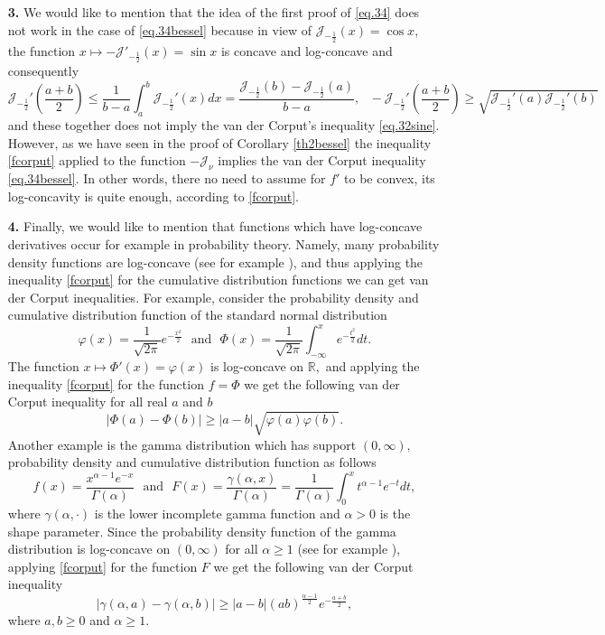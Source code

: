 \documentclass[10pt]{amsart}
\begin{document}
\begin{enumerate}
\item[\bf 3.] We would like to mention that the idea of the first proof of \eqref{eq.34} does not work in the case of \eqref{eq.34bessel} because in view of
$\mathcal{J}_{-\frac{1}{2}}(x)=\cos x,$ the function
$x\mapsto -\mathcal{J}'_{-\frac{1}{2}}(x)=\sin x$ is concave and log-concave and consequently
$$\mathcal{J}_{-\frac{1}{2}}'\left(\frac{a+b}{2}\right)\leq \frac{1}{b-a}\int_a^b\mathcal{J}_{-\frac{1}{2}}'(x)dx=\frac{\mathcal{J}_{-\frac{1}{2}}(b)-\mathcal{J}_{-\frac{1}{2}}(a)}{b-a},\ \ \ -\mathcal{J}_{-\frac{1}{2}}'\left(\frac{a+b}{2}\right)\geq \sqrt{\mathcal{J}_{-\frac{1}{2}}'(a)\mathcal{J}_{-\frac{1}{2}}'(b)}$$
and these together does not imply the van der Corput's inequality \eqref{eq.32sine}. However, as we have seen in the proof of Corollary \ref{th2bessel} the inequality \eqref{fcorput} applied to the function $-\mathcal{J}_{\nu}$ implies the van der Corput inequality \eqref{eq.34bessel}. In other words, there no need to assume for $f'$ to be convex, its log-concavity is quite enough, according to \eqref{fcorput}.

\item[\bf 4.] Finally, we would like to mention that functions which have log-concave derivatives occur for example in probability theory. Namely, many probability density functions are log-concave (see for example \cite{bargeo}), and thus applying the inequality \eqref{fcorput} for the cumulative distribution functions we can get van der Corput inequalities. For example, consider the probability density and cumulative distribution function of the standard normal distribution
$$\varphi(x)=\frac{1}{\sqrt{2\pi}}e^{-\frac{x^2}{2}}\ \ \ \mbox{and}\ \ \ \Phi(x)=\frac{1}{\sqrt{2\pi}}\int_{-\infty}^xe^{-\frac{t^2}{2}}dt.$$
The function $x\mapsto \Phi'(x)=\varphi(x)$ is log-concave on $\mathbb{R},$ and applying the inequality \eqref{fcorput} for the function $f=\Phi$ we get the following van der Corput inequality for all real $a$ and $b$
$$|\Phi(a)-\Phi(b)|\geq |a-b|\sqrt{\varphi(a)\varphi(b)}.$$
Another example is the gamma distribution which has support $(0,\infty),$ probability density and cumulative distribution function as follows
$$f(x)=\frac{x^{\alpha-1}e^{-x}}{\Gamma(\alpha)}\ \ \ \mbox{and} \ \ \  F(x)=\frac{\gamma(\alpha,x)}{\Gamma(\alpha)}=\frac{1}{\Gamma(\alpha)}\int_0^x t^{\alpha-1}e^{-t}dt,$$
where $\gamma(\alpha,\cdot)$ is the lower incomplete gamma function and $\alpha>0$ is the shape parameter. Since the probability density function of the gamma distribution is log-concave on $(0,\infty)$ for all $\alpha\geq 1$ (see for example \cite[p. 192]{bargeo}), applying \eqref{fcorput} for the function $F$ we get the following van der Corput inequality
$$|\gamma(\alpha,a)-\gamma(\alpha,b)|\geq |a-b|(ab)^{\frac{\alpha-1}{2}}e^{-\frac{a+b}{2}},$$
where $a,b\geq 0$ and $\alpha\geq 1.$
\end{enumerate}
\end{document}
